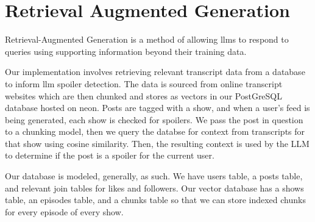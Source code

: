 \documentclass{homework}
\begin{document}
\section{Retrieval Augmented Generation}\label{rag:exp}

Retrieval-Augmented Generation is a method of allowing llms to respond to queries using supporting information beyond their training data. 

Our implementation involves retrieving relevant transcript data from a database to inform llm spoiler detection. The data is sourced from online transcript websites which are then chunked and stores as vectors in our PostGreSQL database hosted on neon. Posts are tagged with a show, and when a user's feed is being generated, each show is checked for spoilers. We pass the post in question to a chunking model, then we query the databse for context from transcripts for that show using cosine similarity. Then, the resulting context is used by the LLM to determine if the post is a spoiler for the current user. 

Our database is modeled, generally, as such. We have users table, a posts table, and relevant join tables for likes and followers. Our vector database has a shows table, an episodes table, and a chunks table so that we can store indexed chunks for every episode of every show.


\newpage


\end{document}
